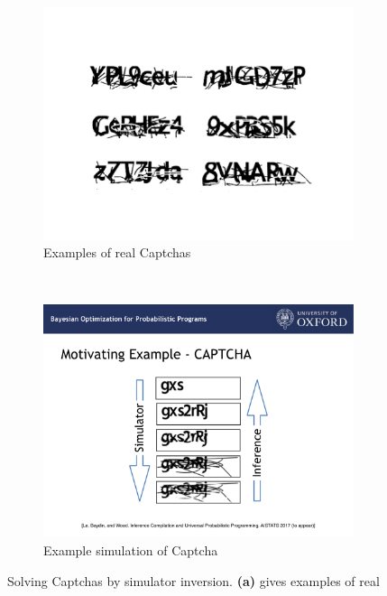 \begin{figure}[t]
	\centering 
	\begin{subfigure}[t]{0.58\textwidth}
		\centering
			\includegraphics[width=\textwidth]{probprog/figures/example_captchas.pdf}
		\caption{Examples of real Captchas
			 \label{fig:probprog:example_captchas}}
	\end{subfigure}
	~~
	\begin{subfigure}[t]{0.38\textwidth}
		\centering
			\includegraphics[width=\textwidth]{probprog/figures/captcha_sim.pdf}
		\caption{Example simulation of Captcha
			\label{fig:probprog:captcha_sim}}
	\end{subfigure}
	\caption{Solving Captchas by simulator inversion.   \textbf{(a)} gives examples of real
}
\end{figure}
